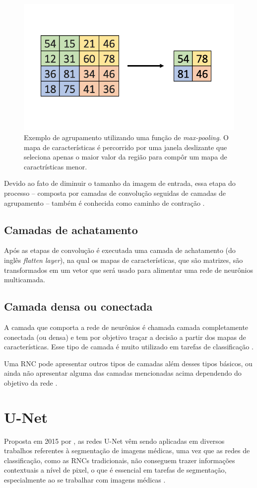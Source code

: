 \begin{figure}[H]
  \centering
  \includegraphics[width=.5\linewidth]{figures/2_theoric_foundamentations/max_pooling_example.pdf}
  \caption[Agrupamento utilizando uma função de \textit{max-pooling}.]{Exemplo de agrupamento utilizando uma função de \textit{max-pooling}. O mapa de características é percorrido por uma janela deslizante que seleciona apenas o maior valor da região para compôr um mapa de caractrísticas menor.}
  \label{fig:pooling}
\end{figure}

Devido ao fato de diminuir o tamanho da imagem de entrada, essa etapa do processo -- composta por camadas de convolução seguidas de camadas de agrupamento -- também é conhecida como caminho de contração \cite{geron2019maos}.

\subsection{Camadas de achatamento}

Após as etapas de convolução é executada uma camada de achatamento (do inglês \textit{flatten layer}), na qual os mapas de características, que são matrizes, são transformados em um vetor que será usado para alimentar uma rede de neurônios multicamada. 

\subsection{Camada densa ou conectada}
A camada que comporta a rede de neurônios é chamada camada completamente conectada (ou densa) e tem por objetivo traçar a decisão a partir dos mapas de características. Esse tipo de camada é muito utilizado em tarefas de classificação \cite{rawat2017deep}.

Uma \ac{RNC} pode apresentar outros tipos de camadas além desses tipos básicos, ou ainda não apresentar alguma das camadas mencionadas acima dependendo do objetivo da rede \cite{mueller2019deep}.

\section{U-Net}
Proposta em 2015 por \cite{ronneberger2015u}, as redes U-Net vêm sendo aplicadas em diversos trabalhos referentes à segmentação de imagens médicas, uma vez que as redes de classificação, como as \ac{RNC}s tradicionais, não conseguem trazer informações contextuais a nível de pixel, o que é essencial em tarefas de segmentação, especialmente ao se trabalhar com imagens médicas \cite{siddique2021u}. 

